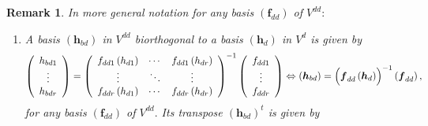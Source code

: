 \documentclass[aps,preprint]{revtex4}
\newtheorem{remark}[theorem]{Remark}
\begin{document}
\begin{remark}
\label{Difference between basis transformation and biorthogonalized basis}
In more general notation for any basis $\left( \boldsymbol{f}_{dd}\right) $
of $V^{dd}:$

\begin{enumerate}
\item A basis $\left( \boldsymbol{h}_{bd}\right) $ in $V^{dd}$ biorthogonal
to a basis $\left( \boldsymbol{h}_{d}\right) $ in $V^{d}$ is given by 
\begin{equation}
\left( 
\begin{array}{c}
h_{bd1} \\ 
\vdots \\ 
h_{bdr}%
\end{array}%
\right) =\left( 
\begin{array}{ccc}
f_{dd1}\left( h_{d1}\right) & \cdots & f_{dd1}\left( h_{dr}\right) \\ 
\vdots & \ddots & \vdots \\ 
f_{ddr}\left( h_{d1}\right) & \cdots & f_{ddr}\left( h_{dr}\right)%
\end{array}%
\right) ^{-1}\left( 
\begin{array}{c}
f_{dd1} \\ 
\vdots \\ 
f_{ddr}%
\end{array}%
\right) \Leftrightarrow \left( \boldsymbol{h}_{bd}\right) =\left( \overset{}{%
\boldsymbol{f}_{dd}\left( \boldsymbol{h}_{d}\right) }\right) ^{-1}\left( 
\boldsymbol{f}_{dd}\right) ,
\end{equation}%
for any basis $\left( \boldsymbol{f}_{dd}\right) $ of $V^{dd}.$ Its
transpose $\left( \boldsymbol{h}_{bd}\right) ^{t}$ is given by


\end{enumerate}
\end{remark}
\end{document}
